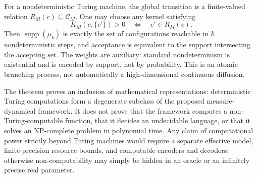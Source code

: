 \begin{remark}
 For a nondeterministic Turing machine, the global transition is a finite-valued
 relation $R_M(c)\subseteq\mathcal C_M$.  One may choose any kernel satisfying
 \[
   K_M(c,\{c'\})>0
   \quad\Longleftrightarrow\quad
   c'\in R_M(c).
 \]
 Then $\operatorname{supp}(\mu_k)$ is exactly the set of configurations
 reachable in $k$ nondeterministic steps, and acceptance is equivalent to the
 support intersecting the accepting set.  The weights are auxiliary: standard
 nondeterminism is existential and is encoded by support, not by probability.
 This is an atomic branching process, not automatically a high-dimensional
 continuous diffusion.
\end{remark}

\begin{remark}
 The theorem proves an inclusion of mathematical representations:
 deterministic Turing computations form a degenerate subclass of the proposed
 measure-dynamical framework.  It does not prove that the framework computes a
 non-Turing-computable function, that it decides an undecidable language, or
 that it solves an NP-complete problem in polynomial time.  Any claim of
 computational power strictly beyond Turing machines would require a separate
 effective model, finite-precision resource bounds, and computable encoders and
 decoders; otherwise non-computability may simply be hidden in an oracle or an
 infinitely precise real parameter.
\end{remark}

%
%
%
